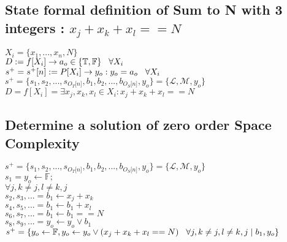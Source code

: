 \documentclass[11pt]{article}
\begin{document}
\subsection{State formal definition of Sum to N with 3 integers : $x_j + x_k + x_l == N$}
\begin{center}
$
X_i = \{x_1,...,x_n,N\}
$
\\ \vspace{2mm}
$
D := f \lbrack X_i \rbrack \rightarrow a_{o} \in \{\mathbb{T}, \mathbb{F}\} \hspace{3mm} \forall X_i
$
\\ \vspace{2mm}
$
s^+ = s^+\lbrack n \rbrack := P \lbrack X_i \rbrack \rightarrow y_{o} : y_o = a_{o} \hspace{3mm} \forall X_i
$
\\ \vspace{2mm}
$
s^+ = \{ s_1,s_2,...,s_{O_T \lbrack n \rbrack }, b_1, b_2,...,b_{O_S \lbrack n \rbrack},y_o \} = \{ \mathcal{L},\mathcal{M},y_o\}
$
\\ \vspace{6mm}
$
D = f[X_i] = \exists x_j,x_k,x_l \in X_i : x_j + x_k + x_l == N
$
\end{center}

\subsection{Determine a solution of zero order Space Complexity}
\begin{center}
\vspace{1.5mm}
$
s^+ = \{ s_1,s_2,...,s_{O_T \lbrack n \rbrack }, b_1, b_2,...,b_{O_S \lbrack n \rbrack},y_o \} = \{ \mathcal{L},\mathcal{M},y_o\}
$
\\ \vspace{2mm}
$
s_1 = y_o \leftarrow \mathbb{F};
$
\\ \vspace{2mm}
$
\forall j, k \neq j, l \neq k,j
$
\\ \vspace{2mm}
$
s_2,s_3,... =  b_1 \leftarrow x_j + x_k
$
\\ \vspace{2mm}
$
s_4,s_5,... =  b_1 \leftarrow b_1 + x_l
$
\\ \vspace{2mm}
$
s_6,s_7,... = b_1 \leftarrow b_1 == N
$
\\ \vspace{2mm}
$
s_8,s_9,... = y_o \leftarrow y_o \lor b_1
$
\\ \vspace{2mm}
$
s^+ = \{y_o \leftarrow \mathbb{F},y_o \leftarrow y_o \lor (x_j + x_k + x_l == N) \hspace{3mm} \forall j, k \neq j, l \neq k,j \hspace{1mm}| \hspace{1mm} b_1,y_o\}
$
\end{center}
\end{document}
